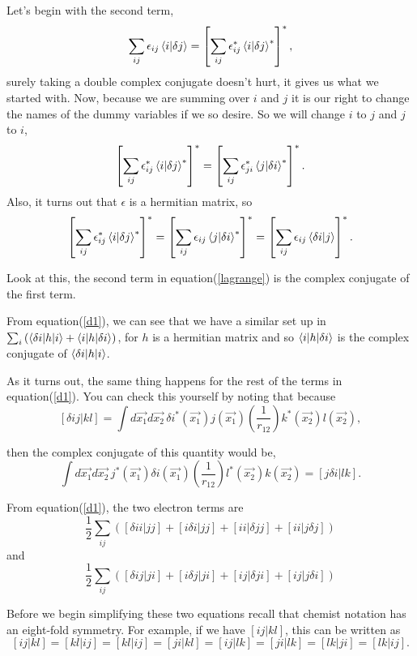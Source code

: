 \documentclass[a4paper]{article}
\begin{document}
Let's begin with the second term,
$$
\sum_{ij} \epsilon_{ij} \braket{i | \delta j} = \left[ \sum_{ij} \epsilon^{*}_{ij} \braket{i | \delta j}^* \right]^* ,
$$
surely taking a double complex conjugate doesn't hurt, it gives us what we started with.
Now, because we are summing over $i$ and $j$ it is our right to change the names of the dummy variables if we so desire. So we will change $i$ to $j$ and $j$ to $i$,
$$
\left[ \sum_{ij} \epsilon^{*}_{ij} \braket{i | \delta j}^* \right]^* = \left[ \sum_{ij} \epsilon^{*}_{ji} \braket{j | \delta i}^* \right]^* .
$$
Also, it turns out that \textbf{$\epsilon$} is a hermitian matrix, so
$$
\left[ \sum_{ij} \epsilon^{*}_{ij} \braket{i | \delta j}^* \right]^* = 
\left[ \sum_{ij} \epsilon_{ij} \braket{j | \delta i}^* \right]^* =
\left[ \sum_{ij} \epsilon_{ij} \braket{\delta i | j} \right]^* .
$$

Look at this, the second term in equation(\ref{lagrange}) is the complex conjugate of the first term.

From equation(\ref{d1}), we can see that we have a similar set up in $\sum_i \left( \braket{\delta i | h | i} + \braket{i|h|\delta i} \right)$, for $h$ is a hermitian matrix and so $\braket{i|h|\delta i}$ is the complex conjugate of $\braket{\delta i | h | i}$.




As it turns out, the same thing happens for the rest of the terms in equation(\ref{d1}).
You can check this yourself by noting that because
$$
[\delta ij | kl] = \int d\vec{x_1} d\vec{x_2} \, \delta i^{*}(\vec{x_1}) j(\vec{x_1}) \left(\frac{1}{r_{12}}\right) k^{*}(\vec{x_2}) l(\vec{x_2}),
$$

then the complex conjugate of this quantity would be,
$$
\int d\vec{x_1} d\vec{x_2} \, j^{*}(\vec{x_1}) \delta i(\vec{x_1}) \left(\frac{1}{r_{12}}\right) l^{*}(\vec{x_2}) k(\vec{x_2})
= [j \delta i| lk] .
$$


From equation(\ref{d1}), the two electron terms are
\begin{equation} \label{ex1}
\frac{1}{2}\sum_{ij} \left( [\delta i i | jj] + [i \delta i | jj] + [i i |\delta jj] + [ii | j\delta j]\right)
\end{equation}
and
\begin{equation} \label{ex2}
\frac{1}{2}\sum_{ij} \left( [\delta i j | ji] + [i \delta j | ji] + [i j |\delta ji] + [ij | j\delta i]\right)
\end{equation}

Before we begin simplifying these two equations recall that chemist notation has an eight-fold symmetry.
For example, if we have $[ij|kl]$, this can be written as
$$
[ij|kl] = [kl|ij] = [kl|ij] = [ji|kl] = [ij|lk] = [ji|lk] = [lk|ji] = [lk|ij].
$$
\end{document}
